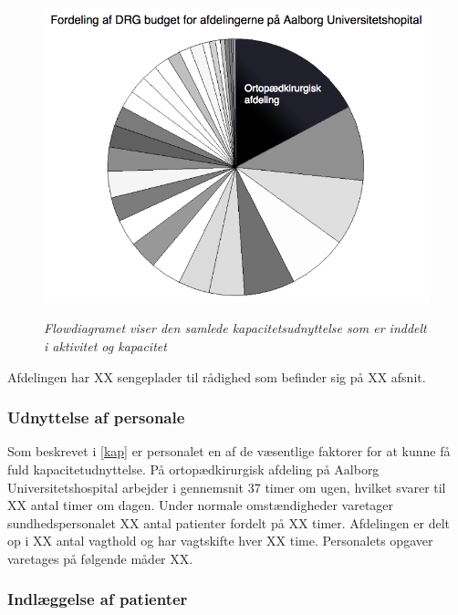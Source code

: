 \begin{figure}[H]
\flushleft 
	\centering
	\includegraphics[scale=.45]{figures/ortopaeddiagram.png}
	\label{kapacitet}
	\flushleft
	\caption{\textit{Flowdiagramet viser den samlede kapacitetsudnyttelse som er inddelt i aktivitet og kapacitet \cite{Company2013}}}
\end{figure}

Afdelingen har XX sengeplader til rådighed som befinder sig på XX afsnit. 

\subsubsection{Udnyttelse af personale} 
Som beskrevet i \ref{kap} er personalet en af de væsentlige faktorer for at kunne få fuld kapacitetudnyttelse. På ortopædkirurgisk afdeling på Aalborg Universitetshospital arbejder i gennemsnit 37 timer om ugen, hvilket svarer til XX antal timer om dagen. \cite{Danske2015} Under normale omstændigheder varetager sundhedspersonalet XX antal patienter fordelt på XX timer. Afdelingen er delt op i XX antal vagthold og har vagtskifte hver XX time. Personalets opgaver varetages på følgende måder XX. 

\subsubsection{Indlæggelse af patienter}

